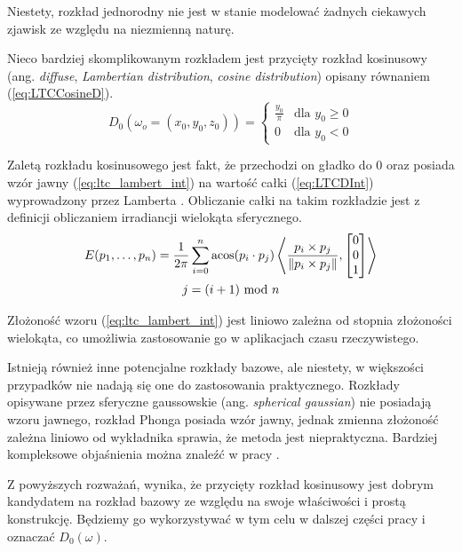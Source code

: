 \documentclass[../main.tex]{subfiles}
\begin{document}
Niestety, rozkład jednorodny nie jest w stanie modelować żadnych ciekawych zjawisk ze względu na niezmienną naturę.

Nieco bardziej skomplikowanym rozkładem jest przycięty rozkład kosinusowy (ang. \textit{diffuse}, \textit{Lambertian distribution}, \textit{cosine distribution}) opisany równaniem (\ref{eq:LTCCosineD}).
\begin{equation}
D_0(\omega_o=(x_0, y_0, z_0)) = \begin{cases}
  \frac{y_0}{\pi} & \text{dla } y_0 \geq 0 \\
  0 & \text{dla } y_0 < 0
\end{cases}
\label{eq:LTCCosineD}
\end{equation}

Zaletą rozkładu kosinusowego jest fakt, że przechodzi on gładko do $0$ oraz posiada wzór jawny (\ref{eq:ltc_lambert_int}) na wartość całki (\ref{eq:LTCDInt}) wyprowadzony przez Lamberta \cite{Baum}. Obliczanie całki na takim rozkładzie jest z definicji obliczaniem irradiancji wielokąta sferycznego.
\begin{equation}
\begin{gathered}
E(p_1, \ldots, p_n) =
\frac{1}{2\pi}
\sum_{i=0}^{n} {
  \acos(p_i \cdot p_j)
  \left\langle {
    \frac{p_i \times p_j}{\norm{p_i \times p_j}},
    \left[ \begin{matrix} 0 \\ 0 \\ 1 \end{matrix} \right]
  } \right\rangle
} \\
j = (i+1) \text{ mod } n
\end{gathered}
\label{eq:ltc_lambert_int}
\end{equation}

Złożoność wzoru (\ref{eq:ltc_lambert_int}) jest liniowo zależna od stopnia złożoności wielokąta, co umożliwia zastosowanie go w aplikacjach czasu rzeczywistego.

Istnieją również inne potencjalne rozkłady bazowe, ale niestety, w większości przypadków nie nadają się one do zastosowania praktycznego. Rozkłady opisywane przez sferyczne gaussowskie (ang. \textit{spherical gaussian}) nie posiadają wzoru jawnego, rozkład Phonga posiada wzór jawny, jednak zmienna złożoność zależna liniowo od wykładnika sprawia, że metoda jest niepraktyczna. Bardziej kompleksowe objaśnienia można znaleźć w pracy \cite{ltc_heitz}.

Z powyższych rozważań, wynika, że przycięty rozkład kosinusowy jest dobrym kandydatem na rozkład bazowy ze względu na swoje właściwości i prostą konstrukcję. Będziemy go wykorzystywać w tym celu w dalszej części pracy i oznaczać $D_0(\omega)$.
\end{document}
